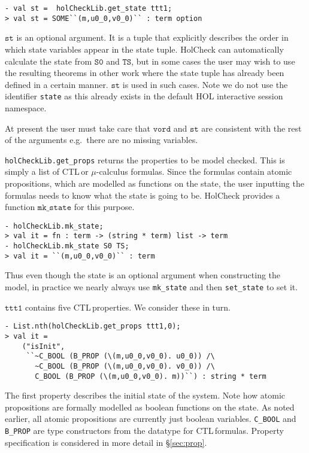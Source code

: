 \documentclass[12pt,fleqn]{article}
\newcommand{\ctl}{\textsf{CTL}\,}
\newcommand{\hc}{HolCheck}
\begin{document}
\begin{session}\begin{verbatim}
- val st =  holCheckLib.get_state ttt1;
> val st = SOME``(m,u0_0,v0_0)`` : term option
\end{verbatim}\end{session}
\(\mathtt{st}\) is an optional argument. It is a \HOL{} tuple that explicitly describes the order in which state variables appear in the state tuple. \hc{} can automatically calculate the state from \(\mathtt{S0}\) and \(\mathtt{TS}\), but in some cases the user may wish to use the resulting theorems in other work where the state tuple has already been defined in a certain manner. \(\mathtt{st}\) is used in such cases. Note we do not use the identifier \texttt{state} as this already exists in the default HOL interactive session namespace.

At present the user must take care that \(\mathtt{vord}\) and \(\mathtt{st}\) are consistent with the rest of the arguments e.g.\ there are no missing variables.

\texttt{holCheckLib.get\_props} returns the properties to be model checked. This is simply a list of \ctl or \(\mu\)-calculus formulas. Since the formulas contain atomic propositions, which are modelled as functions on the state, the user inputting the formulas needs to know what the state is going to be. \hc{} provides a function \(\mathtt{mk\_state}\) for this purpose.

\begin{session}
\begin{verbatim}
- holCheckLib.mk_state;
> val it = fn : term -> (string * term) list -> term
- holCheckLib.mk_state S0 TS;
> val it = ``(m,u0_0,v0_0)`` : term
\end{verbatim}
\end{session}

Thus even though the state is an optional argument when constructing the model, in practice we nearly always use \texttt{mk\_state} and then \texttt{set\_state} to set it.

\(\mathtt{ttt1}\) contains five \ctl properties. We consider these in turn.

\begin{session}
\begin{verbatim}
- List.nth(holCheckLib.get_props ttt1,0);
> val it =
    ("isInit",
     ``~C_BOOL (B_PROP (\(m,u0_0,v0_0). u0_0)) /\
       ~C_BOOL (B_PROP (\(m,u0_0,v0_0). v0_0)) /\
       C_BOOL (B_PROP (\(m,u0_0,v0_0). m))``) : string * term
\end{verbatim}
\end{session}
The first property describes the initial state of the system. Note how atomic propositions are formally modelled as boolean functions on the state. As noted earlier, all atomic propositions are currently just boolean variables. \texttt{C\_BOOL} and \texttt{B\_PROP} are type constructors from the \HOL{} datatype for \ctl formulas. Property specification is considered in more detail in \S\ref{sec:prop}.
\end{document}
